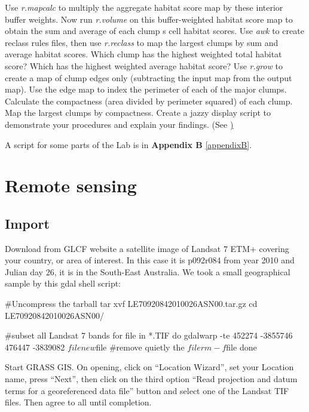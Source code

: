 Use \textit{r.mapcalc} to multiply the aggregate habitat score map by these interior buffer weights.
Now run \textit{r.volume }on this buffer-weighted habitat score map to obtain the sum and average of each clump s cell habitat scores.
Use \textit{awk} to create reclass rules files, then use \textit{r.reclass} to map the largest clumps by sum and average habitat scores.
Which clump has the highest weighted total habitat score? Which has the highest weighted average habitat score?
Use \textit{r.grow} to create a map of clump edges only (subtracting the input map from the output map).
Use the edge map to index the perimeter of each of the major clumps.
Calculate the compactness (area divided by perimeter squared) of each clump.
Map the largest clumps by compactness. Create a jazzy display script to demonstrate your procedures and explain your findings.
(See \href{http://www.udel.edu/johnmack/frec682/script_ideas.html})

A script for some parts of the Lab is in \textbf{Appendix B} \ref{appendixB}.

\newpage
\section{Remote sensing}
\label{remote_sensing}

\subsection{Import}
\label{Import}

Download from GLCF website a satellite image of Landsat 7 ETM+ covering your country, or area of interest. In this case it is p092r084 from year 2010 and Julian day 26, it is in the South-East Australia. We took a small geographical sample by this gdal shell script:

\begin{smallverbatim}
 #Uncompress the tarball
 tar xvf LE70920842010026ASN00.tar.gz
 cd LE70920842010026ASN00/

 #subset all Landsat 7 bands
 for file in *.TIF
   do gdalwarp -te 452274 -3855746 476447
      -3839082 $file new$file
   #remove quietly the $file
   rm -f $file
 done
\end{smallverbatim}


Start GRASS GIS. On opening, click on ``Location Wizard'', set your Location name, press ``Next'', then click on the third option ``Read projection and datum terms for a georeferenced data file'' button and select one of the Landsat TIF files. Then agree to all until completion.

